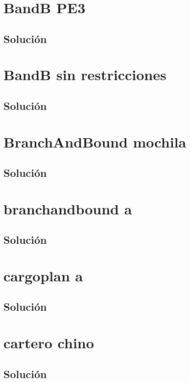 \section{BandB PE3}

\subsection*{Solución}

\clearpage
\section{BandB sin restricciones}

\subsection*{Solución}

\clearpage
\section{BranchAndBound mochila}

\subsection*{Solución}

\clearpage
\section{branchandbound a}

\subsection*{Solución}

\clearpage
\section{cargoplan a}

\subsection*{Solución}

\clearpage
\section{cartero chino}

\subsection*{Solución}

\clearpage
